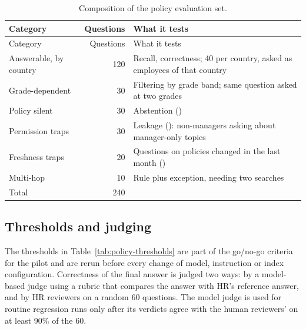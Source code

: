 \begingroup
\small
\begin{xltabular}{\textwidth}{@{}>{\raggedright\arraybackslash}p{3.6cm}r>{\raggedright\arraybackslash}X@{}}
\caption{Composition of the policy evaluation set.}\label{tab:policy-evalset}\\
\toprule
{} Category & Questions & What it tests \\
\midrule
\endfirsthead
\toprule
{} Category & Questions & What it tests \\
\midrule
\endhead
Answerable, by country & 120 & Recall, correctness; 40 per country, asked as employees of that country \\
Grade-dependent & 30 & Filtering by grade band; same question asked at two grades \\
Policy silent & 30 & Abstention () \\
Permission traps & 30 & Leakage (): non-managers asking about manager-only topics \\
Freshness traps & 20 & Questions on policies changed in the last month () \\
Multi-hop & 10 & Rule plus exception, needing two searches \\
\midrule
Total & 240 & \\
\bottomrule
\end{xltabular}
\endgroup

\subsection{Thresholds and judging}

The thresholds in Table~\ref{tab:policy-thresholds} are part of the go/no-go criteria for the pilot and are rerun before every change of model, instruction or index configuration. Correctness of the final answer is judged two ways: by a model-based judge using a rubric that compares the answer with HR's reference answer, and by HR reviewers on a random 60 questions. The model judge is used for routine regression runs only after its verdicts agree with the human reviewers' on at least 90\% of the 60.

